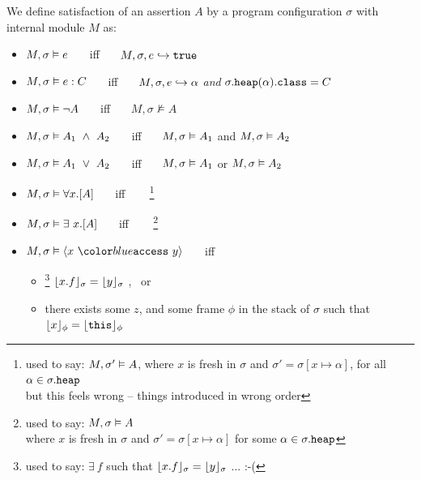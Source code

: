 \begin{definition} 
\label{def:chainmail-semantics}
We define satisfaction of an assertion $A$ by a program configuration $\sigma$ with internal module $M$ as:
\begin{itemize}
\item
$M , \sigma \vDash e$ \ \ \ iff \ \ \  $M, \sigma, e \hookrightarrow \texttt{true}$
\item
$M , \sigma \vDash e : C$ \ \ \ iff \ \ \  $M, \sigma, e \hookrightarrow \alpha$ \textit{and} $\sigma.{\texttt{heap}}(\alpha).{\texttt{class}} = C$
\item
$M , \sigma \vDash \neg A$ \ \ \ iff \ \ \  ${M},{\sigma}\nvDash{A}$
\item
$\satisfiesA{M}{\sigma}{A_1\ \wedge\ A_2}$ \ \ \ iff \ \ \  $M , \sigma \vDash A_1$ and 
$M , \sigma \vDash A_2$
\item
$\satisfiesA{M}{\sigma}{A_1\ \vee\ A_2}$ \ \ \ iff \ \ \  $M , \sigma \vDash A_1$ or 
$M , \sigma \vDash A_2$
\item
$M , \sigma \vDash \forall x.[A]$ \ \ \ iff \ \ \  
\footnote{used to say: $M , \sigma' \vDash A$, 
where $x$ is fresh in $\sigma$ and $\sigma' = \sigma[x \mapsto \alpha]$, 
for all $\alpha \in \sigma.{\texttt{heap}}$
\\
but this feels wrong -- things introduced in wrong order}
\item
$M , \sigma \vDash \exists\ x.[A]$ \ \ \ iff \ \ \  
\footnote{used to say: $M , \sigma \vDash A$ \\
where $x$ is fresh in $\sigma$ and $\sigma' = \sigma[x \mapsto \alpha]$
for some $\alpha \in \sigma.{\texttt{heap}}$}
\item
$\satisfiesA{M}{\sigma}{\access{x}{y}}$ \ \ \ iff \ \ \  
\begin{itemize}
\item
\footnote{used to say: $\exists\ f$ such that $\lfloor x.f \rfloor_{\sigma}={\lfloor y \rfloor_{\sigma}}$ ... :-(}
$\lfloor x.f \rfloor_{\sigma}={\lfloor y \rfloor_{\sigma}}$ , \  or
\item
there exists some $z$, and some frame $\phi$ in the stack of $\sigma$ such that $\lfloor x \rfloor_{\phi}=\lfloor {\texttt{this}} \rfloor_{\phi}$ 

\end{itemize}
\end{itemize}
\end{definition}
